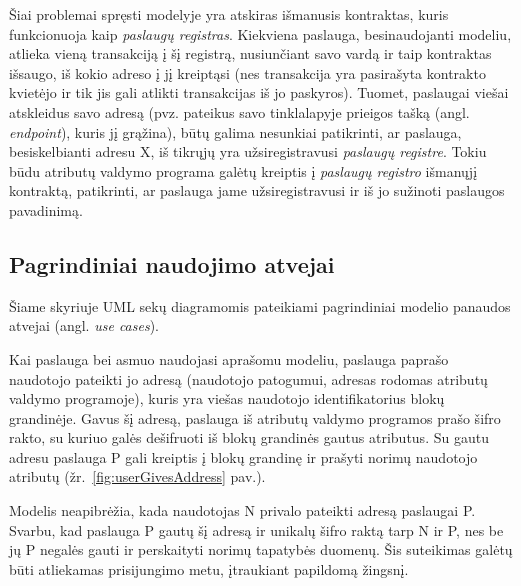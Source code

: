 Šiai problemai spręsti modelyje yra atskiras išmanusis kontraktas, kuris funkcionuoja kaip \textit{paslaugų registras}. Kiekviena
paslauga, besinaudojanti modeliu, atlieka vieną transakciją į šį registrą, nusiunčiant savo vardą ir taip kontraktas išsaugo, iš kokio adreso į jį kreiptąsi (nes
transakcija yra pasirašyta kontrakto kvietėjo ir tik jis gali atlikti transakcijas iš jo paskyros). Tuomet, paslaugai viešai
atskleidus savo adresą (pvz. pateikus savo tinklalapyje prieigos tašką (angl. \textit{endpoint}), kuris jį grąžina), būtų galima
nesunkiai patikrinti, ar paslauga, besiskelbianti adresu X, iš tikrųjų yra užsiregistravusi \textit{paslaugų registre}. Tokiu būdu
atributų valdymo programa galėtų kreiptis į \textit{paslaugų registro} išmanųjį kontraktą, patikrinti, ar paslauga jame užsiregistravusi ir iš jo sužinoti paslaugos
pavadinimą. 

\subsection{Pagrindiniai naudojimo atvejai}

Šiame skyriuje UML sekų diagramomis pateikiami pagrindiniai modelio panaudos atvejai (angl. \textit{use cases}).


Kai paslauga bei asmuo naudojasi aprašomu modeliu, paslauga paprašo naudotojo pateikti jo adresą (naudotojo patogumui, adresas rodomas
atributų valdymo programoje),
kuris yra viešas naudotojo identifikatorius blokų grandinėje.
Gavus šį adresą, paslauga iš atributų valdymo programos prašo šifro rakto, su kuriuo galės dešifruoti iš blokų grandinės gautus atributus.
Su gautu adresu paslauga P gali kreiptis į blokų grandinę ir prašyti norimų naudotojo atributų (žr.\hypertarget{fig:userGivesAddress}{~\ref{fig:userGivesAddress} pav.}).

Modelis neapibrėžia, kada naudotojas N privalo pateikti adresą paslaugai P. Svarbu, kad paslauga P gautų šį adresą ir unikalų šifro raktą tarp N ir P,
nes be jų P negalės gauti ir perskaityti norimų tapatybės duomenų. Šis suteikimas galėtų būti atliekamas prisijungimo metu, įtraukiant
papildomą žingsnį.


